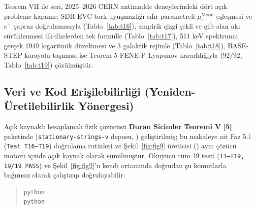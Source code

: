 \documentclass[12pt,a4paper]{article}
\begin{document}
Teorem VII ile seri, 2025--2026 CERN antimadde deneylerindeki dört açık probleme kapanır: SDR-EVC tork uyuşmazlığı sıfır-parametreli $\mu_s^{\mathrm{Meral}}$ eşleşmesi ve $e^+$ çapraz doğrulamasıyla (Tablo~\ref{tab:t16}), ampirik çizgi şekli ve çift-alan akı sürüklenmesi ilk-ilkelerden tek formülle (Tablo~\ref{tab:t17}), 511 keV spektrumu gerçek 1949 logaritmik düzeltmesi ve 3 galaktik rejimle (Tablo~\ref{tab:t18}), BASE-STEP karayolu taşıması ise Teorem 5 FENE-P Lyapunov kararlılığıyla ($92/92$, Tablo~\ref{tab:t19}) çözülmüştür.

\subsection*{Veri ve Kod Erişilebilirliği (Yeniden-Üretilebilirlik Yönergesi)}

Açık kaynaklı hesaplamalı fizik çözücüsü \textbf{Duran Sicimler Teoremi V [5]} paketinde (\texttt{stationary-strings-v} deposu, ) geliştirilmiş; bu makaleye ait Faz 5.1 (\texttt{Test T16--T19}) doğrulama rutinleri ve Şekil~\ref{fig:fig9} üreticisi () aynı çözücü motoru içinde açık kaynak olarak sunulmuştur. Okuyucu tüm 19 testi (\texttt{T1--T19, 19/19 PASS}) ve Şekil~\ref{fig:fig9}'u kendi ortamında doğrudan şu komutlarla bağımsız olarak çalıştırıp doğrulayabilir:
\begin{quote}
\small
\texttt{python}  \\
\texttt{python} 
\end{quote}
\end{document}
